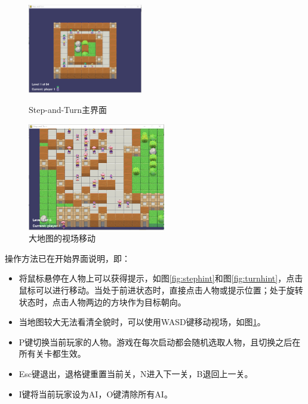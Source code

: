 \begin{figure}[htbp]
\begin{minipage}[t]{0.5\linewidth}
	\centering
	\includegraphics[width=5cm]{pic/ui.png}
	\caption{Step-and-Turn主界面}
	\label{fig:ui}
\end{minipage}
\begin{minipage}[t]{0.5\linewidth}
	\centering
	\includegraphics[width=6cm]{pic/bigmap.png}
	\caption{大地图的视场移动}
	\label{fig:bigmap}
\end{minipage}
\end{figure}

操作方法已在开始界面说明，即：
\begin{itemize}
	\item 将鼠标悬停在人物上可以获得提示，如图\ref{fig:stephint}和图\ref{fig:turnhint}，点击鼠标可以进行移动。当处于前进状态时，直接点击人物或提示位置；处于旋转状态时，点击人物两边的方块作为目标朝向。
	\item 当地图较大无法看清全貌时，可以使用{\ttfamily WASD}键移动视场，如图\ref{fig:bigmap}。
	\item {\ttfamily P}键切换当前玩家的人物。游戏在每次启动都会随机选取人物，且切换之后在所有关卡都生效。
	\item {\ttfamily Esc}键退出，退格键重置当前关，{\ttfamily N}进入下一关，{\ttfamily B}退回上一关。
	\item {\ttfamily I}键将当前玩家设为AI，{\ttfamily O}键清除所有AI。
\end{itemize}

